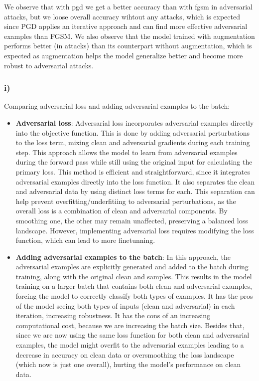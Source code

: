 \documentclass{article}
\begin{document}
We observe that with pgd we get a better accuracy than with fgsm in adversarial attacks, but we loose overall accuracy wihtout any attacks, which is expected since PGD applies an iterative approach and can find more effective adversarial examples than FGSM. We also observe that the model trained with augmentation performs better (in attacks) than its counterpart without augmentation, which is expected as augmentation helps the model generalize better and become more robust to adversarial attacks.

\subsubsection*{i)}

Comparing adversarial loss and adding adversarial examples to the batch: 

\begin{itemize}
    \item \textbf{Adversarial loss}: Adversarial loss incorporates adversarial examples directly into the objective function. This is done by adding adversarial perturbations to the loss term, mixing clean and adversarial gradients during each training step. This approach allows the model to learn from adversarial examples during the forward pass while still using the original input for calculating the primary loss. This method is efficient and straightforward, since it integrates adversarial examples directly into the loss function. It also separates the clean and adversarial data by using distinct loss terms for each. This separation can help prevent overfitting/underfitiing to adversarial perturbations, as the overall loss is a combination of clean and adversarial components. By smoothing one, the other may remain unaffected, preserving a balanced loss landscape. However, implementing adversarial loss requires modifying the loss function, which can lead to more finetunning. 

    \item \textbf{Adding adversarial examples to the batch}: In this approach, the adversarial examples are explicitly
    generated and added to the batch during training, along with the original clean and samples. This results in the model training on a larger batch that contains both clean and adversarial examples, forcing the model to correctly classify  both types of examples. It has the pros of the model seeing both types of inputs (clean and adversarial) in each iteration, increasing robustness. It has the cons of an increasing computational cost, because we are increasing the batch size. Besides that, since we are now using the same loss function for both clean and adversarial examples, the model might overfit to the adversarial examples leading to a decrease in accuracy on clean data or oversmoothing the loss landscape (which now is just one overall), hurting the model's performance on clean data.
\end{itemize}
\end{document}
